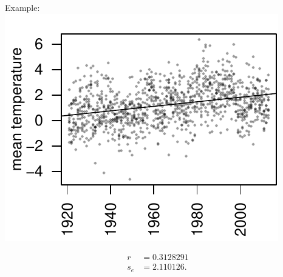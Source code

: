 \begin{frame}{Example:}
    \centering
        \includegraphics{usc-temps-just-regression}

    \begin{align*}
       r &= 0.3128291 \\
        s_e &= 2.110126 .
    \end{align*}


\end{frame}



